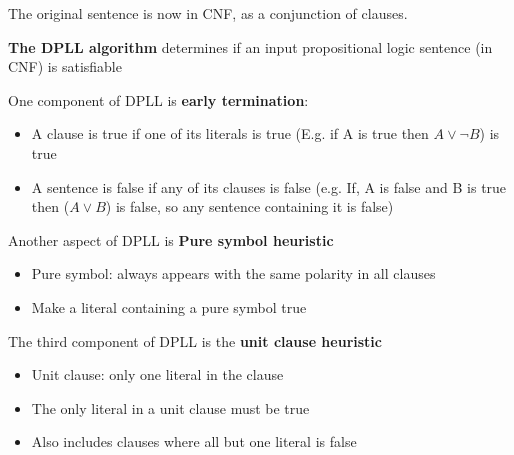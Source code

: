 \documentclass{article}
\begin{document}
The original sentence is now in CNF, as a conjunction of clauses. 

\textbf{The DPLL algorithm} determines if an input propositional logic sentence (in CNF) is satisfiable

One component of DPLL is \textbf{early termination}:
\begin{itemize}
    \item A clause is true if one of its literals is true (E.g. if A is true then $A \vee \neg B$) is true
    \item A sentence is false if any of its clauses is false (e.g. If, A is false and B is true then ($A \vee B$) is false, so any sentence containing it is false)
\end{itemize}

Another aspect of DPLL is \textbf{Pure symbol heuristic}
\begin{itemize}
    \item Pure symbol: always appears with the same polarity in all clauses
    \item Make a literal containing a pure symbol true
\end{itemize}

The third component of DPLL is the \textbf{unit clause heuristic}
\begin{itemize}
    \item Unit clause: only one literal in the clause
    \item The only literal in a unit clause must be true
    \item Also includes clauses where all but one literal is false
\end{itemize}
\end{document}
